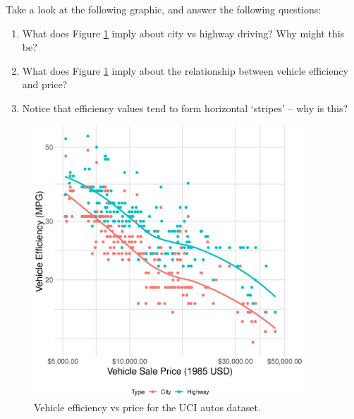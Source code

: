 \documentclass{article}
\begin{document}
Take a look at the following graphic, and answer the following questions:

\begin{enumerate}
\item What does Figure \ref{fig:mpg-vs-usd} imply about city vs highway driving?
  Why might this be?
\item What does Figure \ref{fig:mpg-vs-usd} imply about the relationship between
  vehicle efficiency and price?
\item Notice that efficiency values tend to form horizontal `stripes' -- why is
  this?
\end{enumerate}

\begin{figure}[!ht]
  \includegraphics[width=0.90\textwidth]{../images/mpg_vs_usd}
  \caption{Vehicle efficiency vs price for the UCI autos dataset.}
  \label{fig:mpg-vs-usd}
\end{figure}
\end{document}
